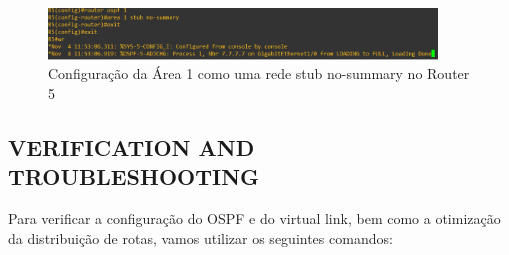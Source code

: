 \documentclass[11pt,english, openright, oneside]{book}
\begin{document}
\begin{figure}[H]
    \centering
    \includegraphics[width=0.92\textwidth]{imagens/Tarefa3/14.optimizing_route_R5.png}
    \caption{Configuração da Área 1 como uma rede stub no-summary no Router 5}
    \label{fig:config22}
\end{figure}
\vspace{0.2cm}

\subsection{VERIFICATION AND TROUBLESHOOTING}
\vspace{0.2cm}

Para verificar a configuração do OSPF e do virtual link, bem como a otimização da distribuição de rotas, vamos utilizar os seguintes comandos:
\vspace{0.2cm}
\end{document}
